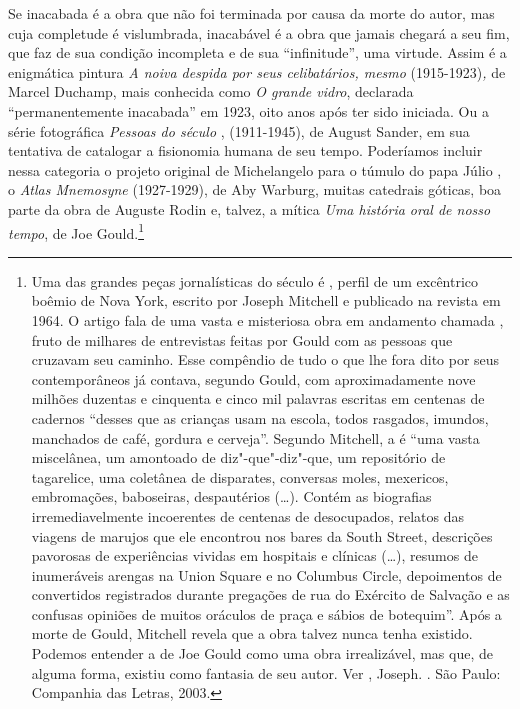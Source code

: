 Se inacabada é a obra que não foi terminada por causa da morte do autor,
mas cuja completude é vislumbrada, inacabável é a obra que jamais
chegará a seu fim, que faz de sua condição incompleta e de sua
``infinitude'', uma virtude. Assim é a enigmática pintura \emph{A noiva
despida por seus celibatários, mesmo} (1915-1923)\emph{,} de Marcel
Duchamp, mais conhecida como \emph{O grande vidro}, declarada
``permanentemente inacabada'' em 1923, oito anos após ter sido iniciada.
Ou a série fotográfica \emph{Pessoas do século }, (1911-1945), de
August Sander, em sua tentativa de catalogar a fisionomia humana de seu
tempo. Poderíamos incluir nessa categoria o projeto original de
Michelangelo para o túmulo do papa Júlio , o \emph{Atlas Mnemosyne}
(1927-1929), de Aby Warburg, muitas catedrais góticas, boa parte da obra
de Auguste Rodin e, talvez, a mítica \emph{Uma história oral de nosso
tempo}, de Joe Gould.\footnote{Uma das grandes peças jornalísticas do
  século  é {}, perfil de um excêntrico
  boêmio de Nova York, escrito por Joseph Mitchell e publicado na
  revista {} em 1964. O artigo fala de uma vasta e
  misteriosa obra em andamento chamada {}, fruto de milhares de entrevistas feitas por Gould com as
  pessoas que cruzavam seu caminho. Esse compêndio de tudo o que lhe
  fora dito por seus contemporâneos já contava, segundo Gould, com
  aproximadamente nove milhões duzentas e cinquenta e cinco mil palavras
  escritas em centenas de cadernos ``desses que as crianças usam na
  escola, todos rasgados, imundos, manchados de café, gordura e
  cerveja''. Segundo Mitchell, a {} é ``uma vasta
  miscelânea, um amontoado de diz"-que"-diz"-que, um repositório de
  tagarelice, uma coletânea de disparates, conversas moles, mexericos,
  embromações, baboseiras, despautérios (\ldots{}). Contém as biografias
  irremediavelmente incoerentes de centenas de desocupados, relatos das
  viagens de marujos que ele encontrou nos bares da South Street,
  descrições pavorosas de experiências vividas em hospitais e clínicas
  (\ldots{}), resumos de inumeráveis arengas na Union Square e no
  Columbus Circle, depoimentos de convertidos registrados durante
  pregações de rua do Exército de Salvação e as confusas opiniões de
  muitos oráculos de praça e sábios de botequim''. Após a morte de
  Gould, Mitchell revela que a obra talvez nunca tenha existido. Podemos
  entender a {} de Joe Gould como uma obra
  irrealizável, mas que, de alguma forma, existiu como fantasia de seu
  autor. Ver , Joseph. {}. São
  Paulo: Companhia das Letras, 2003.}

